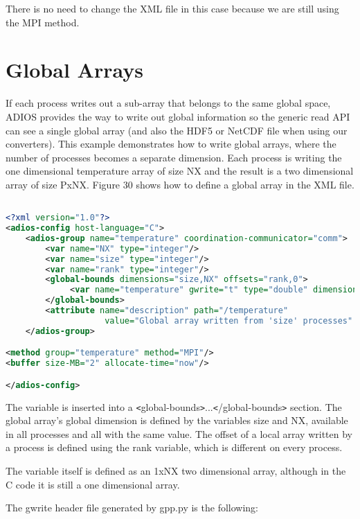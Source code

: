 There is no need to change the XML file in this case because we are still using 
the MPI method. 
\section{Global Arrays}
\label{section-globalarrays}

If each process writes out a sub-array that belongs to the same global space, ADIOS 
provides the way to write out global information so the generic read API can see 
a single global array (and also the HDF5 or NetCDF file when using our converters). 
This example demonstrates how to write global arrays, where the number of processes 
becomes a separate dimension. Each process is writing the one dimensional temperature 
array of size NX and the result is a two dimensional array of size PxNX. Figure 
30 shows how to define a global array in the XML file. 

\begin{lstlisting}[language=XML,caption=Config.xml for a global array 
(examples/C/global-array/adios\_global.xml]

<?xml version="1.0"?>
<adios-config host-language="C">
    <adios-group name="temperature" coordination-communicator="comm">
        <var name="NX" type="integer"/>
        <var name="size" type="integer"/>
        <var name="rank" type="integer"/>
        <global-bounds dimensions="size,NX" offsets="rank,0">
             <var name="temperature" gwrite="t" type="double" dimensions="1,NX"/>
        </global-bounds>
        <attribute name="description" path="/temperature"
                    value="Global array written from 'size' processes" type="string"/>
    </adios-group>

<method group="temperature" method="MPI"/>
<buffer size-MB="2" allocate-time="now"/>

</adios-config>
\end{lstlisting}

The variable is inserted into a \texttt{<}global-bounds\texttt{>}...\texttt{<}/global-bounds\texttt{>} 
section. The global array's global dimension is defined by the variables size and 
NX, available in all processes and all with the same value. The offset of a local 
array written by a process is defined using the rank variable, which is different 
on every process.

The variable itself is defined as an 1xNX two dimensional array, although in the 
C code it is still a one dimensional array. 

The gwrite header file generated by gpp.py is the following:

